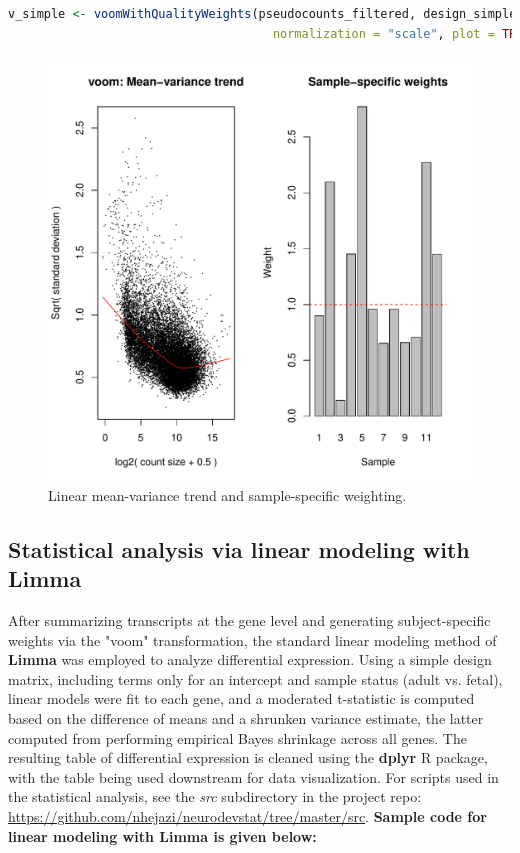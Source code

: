 \documentclass[11pt]{article}
\begin{document}
\begin{lstlisting}[language=R]
  v_simple <- voomWithQualityWeights(pseudocounts_filtered, design_simple,
                                     normalization = "scale", plot = TRUE)
\end{lstlisting}

\begin{figure}[H]
\centering
\includegraphics[scale=0.8]{voomTrend_simplemod.pdf}
\caption{Linear mean-variance trend and sample-specific weighting.}
\end{figure}


\subsection{Statistical analysis via linear modeling with Limma}
After summarizing transcripts at the gene level and generating subject-specific
weights via the "voom" transformation, the standard linear modeling method of
\textbf{Limma} was employed to analyze differential expression. Using a simple
design matrix, including terms only for an intercept and sample status (adult
vs. fetal), linear models were fit to each gene, and a moderated t-statistic is
computed based on the difference of means and a shrunken variance estimate, the
latter computed from performing empirical Bayes shrinkage across all genes. The
resulting table of differential expression is cleaned using the \textbf{dplyr}
R package, with the table being used downstream for data visualization. For
scripts used in the statistical analysis, see the \textit{src} subdirectory in
the project repo:
\url{https://github.com/nhejazi/neurodevstat/tree/master/src}. \textbf{Sample
code for linear modeling with Limma is given below:}
\end{document}
